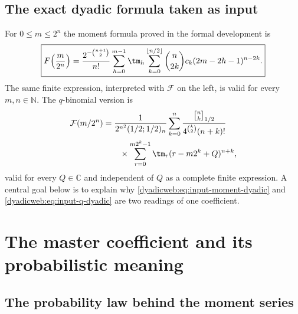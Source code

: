 \documentclass[11pt,oneside]{article}
\theoremstyle{definition}
\theoremstyle{remark}
\newcommand{\C}{\mathbb C}
\newcommand{\N}{\mathbb N}
\newcommand{\qbinom}[3]{\genfrac{[}{]}{0pt}{}{#1}{#2}_{#3}}
\begin{document}
\subsection{The exact dyadic formula taken as input}

For $0\le m\le2^n$ the moment formula proved in the formal development is
\begin{equation}
 \boxed{
 F\!\left(\frac{m}{2^n}\right)
 =\frac{2^{-\binom{n+1}{2}}}{n!}
 \sum_{h=0}^{m-1}\tm_h
 \sum_{k=0}^{\lfloor n/2\rfloor}
 \binom n{2k}c_k(2m-2h-1)^{n-2k}.}                        \label{dyadicweb:eq:input-moment-dyadic}
\end{equation}
The same finite expression, interpreted with $\mathcal F$ on the left, is valid for every
$m,n\in\N$.  The $q$-binomial version is
\begin{align}
 \mathcal F(m/2^n)
 &=\frac{1}{2^{n^2}(1/2;1/2)_n}
 \sum_{k=0}^{n}
 \frac{\qbinom nk{1/2}}{4^{\binom k2}(n+k)!}             \notag\\
 &\qquad\times
 \sum_{r=0}^{m2^k-1}\tm_r(r-m2^k+Q)^{n+k},               \label{dyadicweb:eq:input-q-dyadic}
\end{align}
valid for every $Q\in\C$ and independent of $Q$ as a complete finite expression.  A central
goal below is to explain why \eqref{dyadicweb:eq:input-moment-dyadic} and
\eqref{dyadicweb:eq:input-q-dyadic} are two readings of one coefficient.

\section{The master coefficient and its probabilistic meaning}
\label{dyadicweb:sec:master}

\subsection{The probability law behind the moment series}
\end{document}
